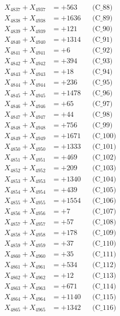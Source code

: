 \documentclass[a4paper,10pt]{article}
\begin{document}
{\begin{align}
X_{4837} + X_{4937} &= +563 && \text{(C\_88)} \\
X_{4838} + X_{4938} &= +1636 && \text{(C\_89)} \\
X_{4839} + X_{4939} &= +121 && \text{(C\_90)} \\
\allowbreak
X_{4840} + X_{4940} &= +1314 && \text{(C\_91)} \\
X_{4841} + X_{4941} &= +6 && \text{(C\_92)} \\
X_{4842} + X_{4942} &= +394 && \text{(C\_93)} \\
X_{4843} + X_{4943} &= +18 && \text{(C\_94)} \\
X_{4844} + X_{4944} &= +236 && \text{(C\_95)} \\
\allowbreak
X_{4845} + X_{4945} &= +1478 && \text{(C\_96)} \\
X_{4846} + X_{4946} &= +65 && \text{(C\_97)} \\
X_{4847} + X_{4947} &= +44 && \text{(C\_98)} \\
X_{4848} + X_{4948} &= +756 && \text{(C\_99)} \\
X_{4849} + X_{4949} &= +1671 && \text{(C\_100)} \\
\allowbreak
X_{4850} + X_{4950} &= +1333 && \text{(C\_101)} \\
X_{4851} + X_{4951} &= +469 && \text{(C\_102)} \\
X_{4852} + X_{4952} &= +209 && \text{(C\_103)} \\
X_{4853} + X_{4953} &= +1340 && \text{(C\_104)} \\
X_{4854} + X_{4954} &= +439 && \text{(C\_105)} \\
\allowbreak
X_{4855} + X_{4955} &= +1554 && \text{(C\_106)} \\
X_{4856} + X_{4956} &= +7 && \text{(C\_107)} \\
X_{4857} + X_{4957} &= +57 && \text{(C\_108)} \\
X_{4858} + X_{4958} &= +178 && \text{(C\_109)} \\
X_{4859} + X_{4959} &= +37 && \text{(C\_110)} \\
\allowbreak
X_{4860} + X_{4960} &= +35 && \text{(C\_111)} \\
X_{4861} + X_{4961} &= +534 && \text{(C\_112)} \\
X_{4862} + X_{4962} &= +12 && \text{(C\_113)} \\
X_{4863} + X_{4963} &= +671 && \text{(C\_114)} \\
X_{4864} + X_{4964} &= +1140 && \text{(C\_115)} \\
\allowbreak
X_{4865} + X_{4965} &= +1342 && \text{(C\_116)} \\

\end{align}}
\end{document}
